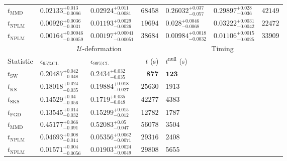 \begin{tabular}{l|llr|llr}
	$t_{\mathrm{MMD}}$ & $0.02133_{-0.0086}^{+0.013}$ & $0.02924_{-0.0081}^{+0.011}$ & $68458$ & $0.26032_{-0.057}^{+0.037}$ & $0.29897_{-0.036}^{+0.028}$ & $42149$ \\
\rowcolor{red!35}	$t_{\mathrm{NPLM}}$ & $0.00926_{-0.0031}^{+0.0036}$ & $0.01193_{-0.0026}^{+0.0029}$ & $19694$ & $0.028_{-0.0068}^{+0.0046}$ & $0.03222_{-0.0042}^{+0.0031}$ & $22472$ \\
\rowcolor{blue!35}	$t_{\mathrm{NPLM}}$ & $0.00164_{-0.00059}^{+0.00046}$ & $0.00197_{-0.00051}^{+0.00041}$ & $38684$ & $0.00984_{-0.0032}^{+0.0018}$ & $0.01106_{-0.0025}^{+0.0015}$ & $33909$ \\
	\toprule
	\multicolumn{1}{c}{} & \multicolumn{3}{c}{$\mathcal{U}$-deformation} & \multicolumn{3}{c}{Timing} \\
Statistic & $\epsilon_{95\%\mathrm{CL}}$ & $\epsilon_{99\%\mathrm{CL}}$ & $t$ (s) & $t^{\mathrm{null}}$ (s) \\
	\midrule
	$t_{\mathrm{SW}}$ & $0.20487_{-0.048}^{+0.042}$ & $0.2434_{-0.035}^{+0.032}$ & ${\mathbf{877}}$ & ${\mathbf{123}}$ \\
	$t_{\overline{\mathrm{KS}}}$ & $0.18018_{-0.035}^{+0.024}$ & $0.19884_{-0.027}^{+0.018}$ & $25630$ & $1913$ \\
	$t_{\mathrm{SKS}}$ & $0.14529_{-0.056}^{+0.04}$ & $0.1719_{-0.048}^{+0.035}$ & $42277$ & $4383$ \\
	$t_{\mathrm{FGD}}$ & ${\mathbf{0.13545_{-0.032}^{+0.014}}}$ & ${\mathbf{0.15299_{-0.012}^{+0.015}}}$ & $12782$ & $1787$ \\
	$t_{\mathrm{MMD}}$ & $0.45177_{-0.091}^{+0.066}$ & $0.52083_{-0.047}^{+0.05}$ & $56078$ & $3504$ \\
\rowcolor{red!35}	$t_{\mathrm{NPLM}}$ & $0.04693_{-0.014}^{+0.008}$ & $0.05356_{-0.0071}^{+0.0062}$ & $29316$ & $2408$ \\
\rowcolor{blue!35}	$t_{\mathrm{NPLM}}$ & $0.01571_{-0.0056}^{+0.004}$ & $0.01903_{-0.0049}^{+0.0024}$ & $29808$ & $5655$ \\
	\bottomrule
\end{tabular}